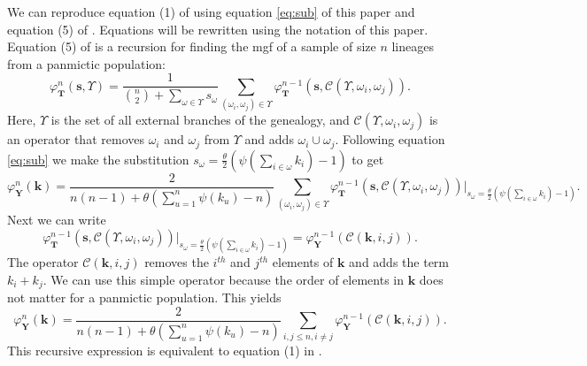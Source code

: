 We can reproduce equation (1) of \citet{Schraiber2015} using equation
\eqref{eq:sub} of this paper and equation (5) of \citet{Lohse2011}. Equations
will be rewritten using the notation of this paper. Equation (5) of
\citet{Lohse2011} is a recursion for finding the mgf of a sample of size $n$
lineages from a panmictic population:
\begin{equation}
  \varphi^n_{\mathbf{T}}(\mathbf{s}, \Upsilon)=
  \frac{1}{{n\choose 2}+\sum_{\omega \in \Upsilon}s_\omega}
  \sum_{(\omega_i, \omega_j) \in \Upsilon}\varphi^{n-1}_{\mathbf{T}}
  (\mathbf{s}, \mathcal{C}(\Upsilon, \omega_i, \omega_j)).
\end{equation}
Here, $\Upsilon$ is the set of all external branches of the genealogy, and
$\mathcal{C}(\Upsilon,\omega_i,\omega_j)$ is an operator that removes $\omega_i$
and $\omega_j$ from $\Upsilon$ and adds $\omega_i \cup \omega_j$. Following
equation \eqref{eq:sub} we make the substitution $s_{\omega}=\frac{\theta}{2}
\left( \psi\left(\sum_{i \in \omega}k_{i}\right) -1 \right)$ to get
\begin{equation}
  \varphi^n_{\mathbf{Y}}(\mathbf{k}) =
  \frac{2}{n(n-1) + \theta(\sum_{u=1}^n \psi(k_u)-n)}
  \sum_{(\omega_i, \omega_j) \in \Upsilon}\varphi^{n-1}_{\mathbf{T}}
  (\mathbf{s}, \mathcal{C}(\Upsilon, \omega_i, \omega_j))
  \Bigr|_{s_{\omega}=\frac{\theta}{2} \left( \psi\left(\sum_{i \in \omega}k_{i}\right) -1 \right)}.
\end{equation}
Next we can write
\begin{equation}
\varphi^{n-1}_{\mathbf{T}}
  (\mathbf{s}, \mathcal{C}(\Upsilon, \omega_i, \omega_j))
\Bigr|_{s_{\omega}=\frac{\theta}{2} \left( \psi\left(\sum_{i \in \omega}k_{i}\right) -1 \right)} =
\varphi^{n-1}_{\mathbf{Y}}(\mathscr{C}(\mathbf{k},i,j)).
\end{equation}
The operator $\mathscr{C}(\mathbf{k},i,j)$ removes the $i^{th}$ and $j^{th}$
elements of $\mathbf{k}$ and adds the term $k_i+k_j$. We can use this simple
operator because the order of elements in $\mathbf{k}$ does not matter for a
panmictic population. This yields
\begin{equation}
  \label{eq:schraiber}
  \varphi^n_{\mathbf{Y}}(\mathbf{k}) =
  \frac{2}{n(n-1) + \theta(\sum_{u=1}^n \psi(k_u)-n)}
  \sum_{i, j\leq n, i \neq j} \varphi^{n-1}_{\mathbf{Y}}(\mathscr{C}(\mathbf{k},i,j)).
\end{equation}
This recursive expression is equivalent to equation (1) in \citet{Schraiber2015}.

